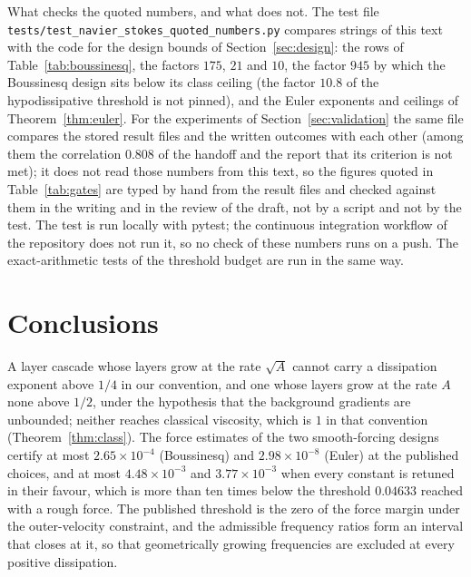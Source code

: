 \documentclass[11pt]{article}
\theoremstyle{remark}
\newcommand{\fp}[1]{\nolinkurl{#1}}
\begin{document}
What checks the quoted numbers, and what does not. The test file \fp{tests/test_navier_stokes_quoted_numbers.py}
compares strings of this text with the code for the design bounds of Section~\ref{sec:design}: the rows of
Table~\ref{tab:boussinesq}, the factors $175$, $21$ and $10$, the factor $945$ by which the Boussinesq design sits below its class
ceiling (the factor $10.8$ of the hypodissipative threshold is not pinned), and the Euler exponents and ceilings of Theorem~\ref{thm:euler}. For the experiments of
Section~\ref{sec:validation} the same file compares the stored result files and the written outcomes with each other
(among them the correlation $0.808$ of the handoff and the report that its criterion is not met); it does not read
those numbers from this text, so the figures quoted in Table~\ref{tab:gates} are typed by hand from the result files and
checked against them in the writing and in the review of the draft, not by a script and not by the test. The test is run locally with pytest; the
continuous integration workflow of the repository does not run it, so no check of these numbers runs on a push.
The exact-arithmetic tests of the threshold budget are run in the same way.


\section{Conclusions}\label{sec:conclusions}

A layer cascade whose layers grow at the rate $\sqrt A$ cannot carry a dissipation exponent above $1/4$ in our
convention, and one whose layers grow at the rate $A$ none above $1/2$, under the hypothesis that the background gradients
are unbounded; neither reaches classical viscosity, which is $1$ in that convention (Theorem~\ref{thm:class}). The force
estimates of the two smooth-forcing designs certify at most $2.65\times10^{-4}$ (Boussinesq) and $2.98\times10^{-8}$
(Euler) at the published choices, and at most $4.48\times10^{-3}$ and $3.77\times10^{-3}$ when every constant is retuned
in their favour, which is more than ten times below the threshold $0.04633$ reached with a rough force. The published
threshold is the zero of the force margin under the outer-velocity constraint, and the admissible frequency ratios form an
interval that closes at it, so that geometrically growing frequencies are excluded at every positive dissipation.
\end{document}
